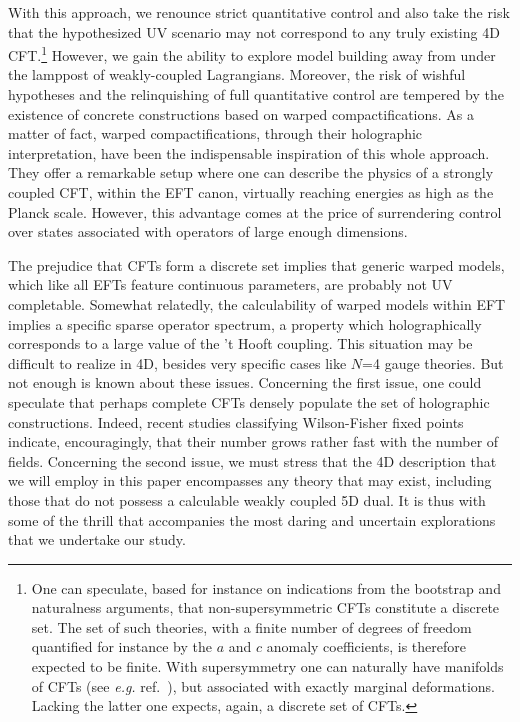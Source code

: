 \documentclass[a4paper,12pt]{article}
\begin{document}
With this approach, we renounce strict quantitative control and also
 take the risk that the hypothesized UV scenario may not correspond to any truly existing 4D CFT.\footnote{One can speculate, based for instance on indications from the bootstrap \cite{Kos:2015mba} and naturalness arguments, that non-supersymmetric CFTs constitute a discrete set. The set of such theories, with a finite number of degrees of freedom quantified for instance by the $a$ and $c$ anomaly coefficients, is therefore expected to be finite.  With supersymmetry one can naturally have manifolds of CFTs (see {\it e.g.} ref.~\cite{Leigh:1995ep}), but  associated with exactly marginal deformations. Lacking the latter one expects, again,  a discrete set of CFTs.}
However, we gain the ability  to explore model building away from under the lamppost of weakly-coupled Lagrangians. Moreover, 
the risk of wishful hypotheses and the relinquishing of full quantitative control are tempered by the existence of concrete constructions  based on warped compactifications. As a matter of fact, warped compactifications, through their holographic interpretation, have been the indispensable inspiration of this whole approach. They offer a remarkable setup where  
one can describe the physics of a strongly coupled CFT, within the EFT canon, virtually reaching energies as high as the Planck scale. However, this advantage comes at the price of surrendering control over states associated with operators of large enough dimensions. 

The prejudice that CFTs  form a discrete set implies that generic warped models, which like all EFTs feature continuous parameters, are probably not UV completable. Somewhat relatedly, the calculability of warped models within EFT implies a specific sparse operator spectrum, a property which holographically corresponds to a large value of the 't Hooft coupling. This situation may be difficult to realize in 4D, besides very specific cases like $N$=4 gauge theories. 
But not enough is known about these issues. Concerning the first issue, one could speculate that perhaps  complete CFTs densely populate the set of holographic constructions. Indeed, recent studies classifying Wilson-Fisher fixed points \cite{Osborn:2020cnf,Pannell:2023tzc} indicate, encouragingly, that their number  grows rather fast with the number of fields. Concerning the second issue, we must  stress that the 4D description that we will employ in this paper encompasses any theory that may exist, including those that do not possess a calculable weakly coupled 5D dual.
It is thus with some of the thrill that accompanies the most daring and uncertain explorations that we undertake our study.
\end{document}

